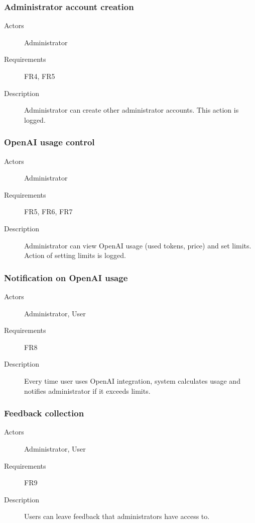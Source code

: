 \documentclass[
    english, %
]{VUMIFPSkursinis}
\begin{document}
\subsubsection{Administrator account creation}

\begin{description}
    \item[Actors] Administrator
    \item[Requirements] FR4, FR5
    \item[Description] Administrator can create other administrator accounts. This action is logged.
\end{description}

\subsubsection{OpenAI usage control}

\begin{description}
    \item[Actors] Administrator
    \item[Requirements] FR5, FR6, FR7
    \item[Description] Administrator can view OpenAI usage (used tokens, price) and set limits. Action of setting limits is logged.
\end{description}

\subsubsection{Notification on OpenAI usage}

\begin{description}
    \item[Actors] Administrator, User
    \item[Requirements] FR8
    \item[Description] Every time user uses OpenAI integration, system calculates usage and notifies administrator if it exceeds limits.
\end{description}

\subsubsection{Feedback collection}

\begin{description}
    \item[Actors] Administrator, User
    \item[Requirements] FR9
    \item[Description] Users can leave feedback that administrators have access to.
\end{description}
\end{document}
